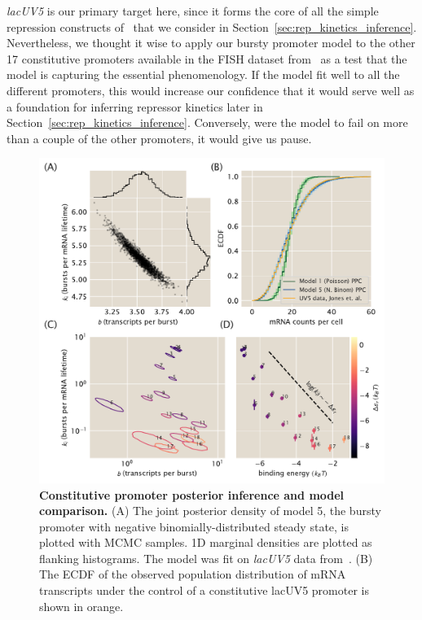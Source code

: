 \textit{lacUV5} is our primary target here, since it forms the
core of all the simple repression constructs of~\cite{Jones2014}
that we consider in Section~\ref{sec:rep_kinetics_inference}.
Nevertheless, we thought it wise to apply our bursty promoter
model to the other 17 constitutive promoters available in the
FISH dataset from~\cite{Jones2014} as a test that the model is
capturing the essential phenomenology. If the model fit well to
all the different promoters, this would increase our confidence
that it would serve well as a foundation for inferring repressor
kinetics later in Section~\ref{sec:rep_kinetics_inference}.
Conversely, were the model to fail on more than a couple of the
other promoters, it would give us pause.

\begin{figure}%
\centering
\includegraphics[width=\textwidth]{../figures/main/fig03.pdf}
\caption{\textbf{Constitutive promoter posterior inference and model
        comparison.}
        (A) The joint posterior density of model 5, the
        bursty promoter with negative binomially-distributed
        steady state, is plotted with MCMC samples.
        1D marginal densities are plotted as flanking histograms.
        The model was fit on \textit{lacUV5} data from~\cite{Jones2014}.
        (B) The ECDF of the observed population distribution of
        mRNA transcripts under the control of a constitutive
        lacUV5 promoter is shown in orange.
}
\end{figure}

